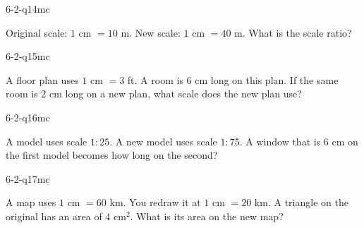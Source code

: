 \begin{practiceQuestion}{6-2-q14}{mc}
\begin{questionText}
Original scale: $1$ cm $= 10$ m. New scale: $1$ cm $= 40$ m. What is the scale ratio?
\end{questionText}
\end{practiceQuestion}

\begin{practiceQuestion}{6-2-q15}{mc}
\begin{questionText}
A floor plan uses $1$ cm $= 3$ ft. A room is $6$ cm long on this plan. If the same room is $2$ cm long on a new plan, what scale does the new plan use?
\end{questionText}
\end{practiceQuestion}

\begin{practiceQuestion}{6-2-q16}{mc}
\begin{questionText}
A model uses scale $1:25$. A new model uses scale $1:75$. A window that is $6$ cm on the first model becomes how long on the second?
\end{questionText}
\end{practiceQuestion}

\begin{practiceQuestion}{6-2-q17}{mc}
\begin{questionText}
A map uses $1$ cm $= 60$ km. You redraw it at $1$ cm $= 20$ km. A triangle on the original has an area of $4$ cm$^2$. What is its area on the new map?
\end{questionText}
\end{practiceQuestion}

